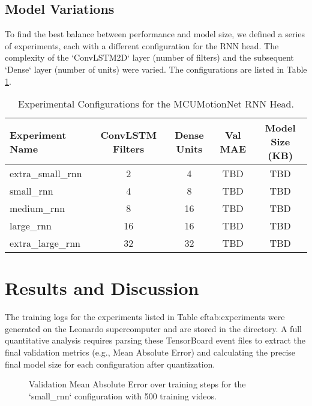 \documentclass{article}
\begin{document}
\subsection{Model Variations}
To find the best balance between performance and model size, we defined a series of experiments, each with a different configuration for the RNN head. The complexity of the `ConvLSTM2D` layer (number of filters) and the subsequent `Dense` layer (number of units) were varied. The configurations are listed in Table \ref{tab:experiments}.

\begin{table}[h!]
\centering
\caption{Experimental Configurations for the MCUMotionNet RNN Head.}
\label{tab:experiments}
\begin{tabular}{|l|c|c|c|c|}
\hline
\textbf{Experiment Name} & \textbf{ConvLSTM Filters} & \textbf{Dense Units} & \textbf{Val MAE} & \textbf{Model Size (KB)} \\ \hline
extra\_small\_rnn & 2 & 4 & TBD & TBD \\
small\_rnn & 4 & 8 & TBD & TBD \\
medium\_rnn & 8 & 16 & TBD & TBD \\
large\_rnn & 16 & 16 & TBD & TBD \\
extra\_large\_rnn & 32 & 32 & TBD & TBD \\ \hline
\end{tabular}
\end{table}

\section{Results and Discussion}
The training logs for the experiments listed in Table ef{tab:experiments} were generated on the Leonardo supercomputer and are stored in the \texttt{} directory. A full quantitative analysis requires parsing these TensorBoard event files to extract the final validation metrics (e.g., Mean Absolute Error) and calculating the precise final model size for each configuration after quantization.

\begin{figure}[h!]
\centering
{}
\caption{Validation Mean Absolute Error over training steps for the `small\_rnn` configuration with 500 training videos.}
\label{fig:validation_mae_small_rnn}
\end{figure}
\end{document}
